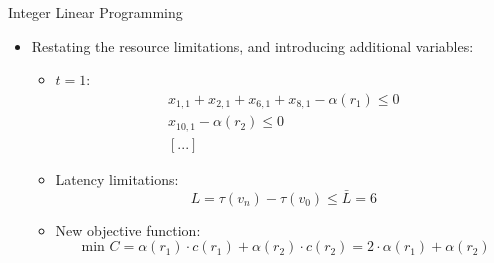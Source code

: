\begin{frame}[allowframebreaks]{Integer Linear Programming}
  \begin{solutionnoinc}
    \begin{itemize}
      \item \alert{Restating the resource limitations, and introducing additional variables:}
        \begin{itemize}
          \item $t=1$:
            \[
            \begin{gathered}
            x_{1,1}+x_{2,1}+x_{6,1}+x_{8,1}-\alpha\left(r_1\right) \leq 0 \\
            x_{10,1}-\alpha\left(r_2\right) \leq 0 \\
            [...]
            \end{gathered}
            \]
          \item \alert{Latency limitations:}
            \[
            L=\tau\left(v_n\right)-\tau\left(v_0\right) \leq \bar{L}=6
            \]
          \item \alert{New objective function:}
            \[
            \text { min } C=\alpha\left(r_1\right) \cdot c\left(r_1\right)+\alpha\left(r_2\right) \cdot c\left(r_2\right)=2 \cdot \alpha\left(r_1\right)+\alpha\left(r_2\right)
            \]
        \end{itemize}
    \end{itemize}
  \end{solutionnoinc}
\end{frame}
